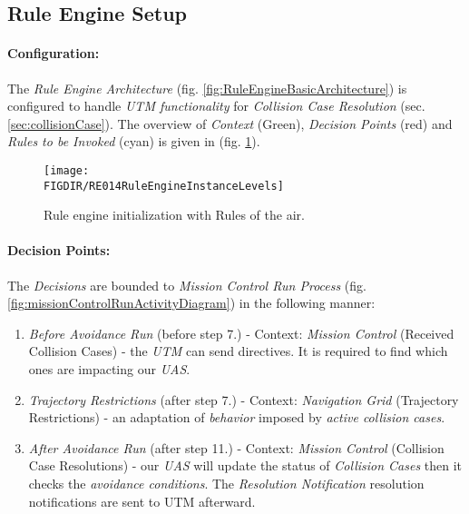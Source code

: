 \subsection{Rule Engine Setup}\label{sec:ruleImplementation}

\paragraph{Configuration:} The \emph{Rule Engine Architecture} (fig. \ref{fig:RuleEngineBasicArchitecture}) is configured to handle \emph{UTM functionality} for \emph{Collision Case Resolution} (sec. \ref{sec:collisionCase}).  The overview of \emph{Context} (Green), \emph{Decision Points} (red) and \emph{Rules to be Invoked} (cyan) is given in (fig. \ref{fig:RuleEngineInstanceLevels}). 

\begin{figure}[H]
    \centering
    \texttt{[image: \\FIGDIR/RE014RuleEngineInstanceLevels]} 
    \caption{Rule engine initialization with Rules of the air.}
    \label{fig:RuleEngineInstanceLevels}
\end{figure}

\paragraph{Decision Points:} The \emph{Decisions} are bounded to \emph{Mission Control Run Process} (fig. \ref{fig:missionControlRunActivityDiagram}) in the following manner:
\begin{enumerate}
    \item \emph{Before Avoidance Run} (before step 7.) - Context: \emph{Mission Control} (Received Collision Cases) - the \emph{UTM} can send  directives. It is required to find which ones are impacting our \emph{UAS}.
    
    \item \emph{Trajectory Restrictions} (after step 7.) - Context: \emph{Navigation Grid} (Trajectory Restrictions) - an adaptation of \emph{behavior} imposed by \emph{active collision cases}.
    
    \item \emph{After Avoidance Run} (after step 11.) - Context: \emph{Mission Control} (Collision Case Resolutions) - our \emph{UAS} will update the status of \emph{Collision Cases} then it checks the \emph{avoidance conditions}. The \emph{Resolution Notification} resolution notifications are sent to UTM afterward.
    
\end{enumerate}

